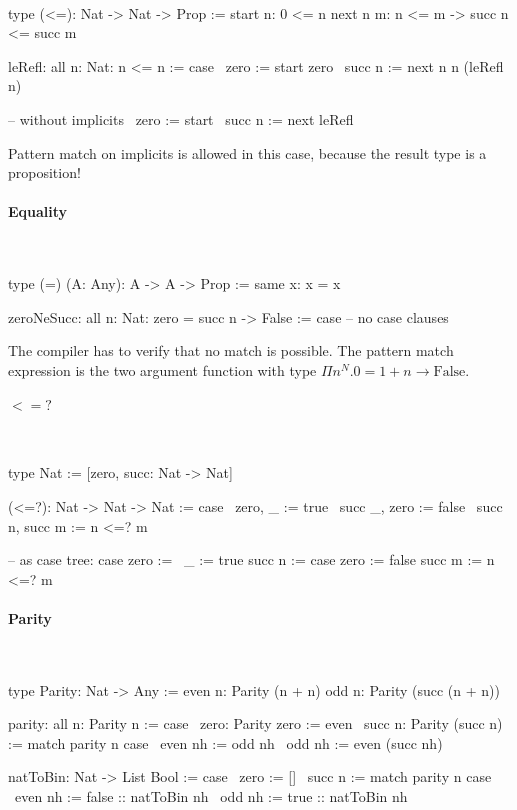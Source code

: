 \ \begin{alba}
    type (<=): Nat -> Nat -> Prop :=
        start {n}:    0 <= n
        next  {n m}:  n <= m -> succ n <= succ m

    leRefl: all {n: Nat}: n <= n := case
        \ {zero}   := start {zero}
        \ {succ n} := next {n} {n} (leRefl {n})

        -- without implicits
        \ {zero}   := start
        \ {succ n} := next leRefl
\end{alba}

Pattern match on implicits is allowed in this case, because the result type is a
proposition!




\paragraph{Equality}

\ \begin{alba}
    type (=) (A: Any): A -> A -> Prop :=
        same {x}: x = x

    zeroNeSucc: all {n: Nat}: zero = succ n -> False :=
        case
            -- no case clauses
\end{alba}

The compiler has to verify that no match is possible. The pattern match
expression is the two argument function with type $\Pi n^N. 0 = 1 + n \to
\text{False}$.



\paragraph{$<=?$}
\ \begin{alba}
    type Nat := [zero, succ: Nat -> Nat]

    (<=?): Nat -> Nat -> Nat := case
        \ zero,   _      :=  true
        \ succ _, zero   :=  false
        \ succ n, succ m :=  n <=? m

    -- as case tree:
    case
        zero           :=   \ _ := true
        succ n :=
            case
                zero   :=   false
                succ m :=   n <=? m
\end{alba}


\paragraph{Parity}
\ \begin{alba}
    type Parity: Nat -> Any :=
        even n: Parity (n + n)
        odd  n: Parity (succ (n + n))

    parity: all n: Parity n := case
        \ zero: Parity zero :=
            even
        \ succ n: Parity (succ n) :=
            match parity n case
                \ even nh :=
                    odd nh
                \ odd nh :=
                    even (succ nh)

    natToBin: Nat -> List Bool := case
        \ zero :=
            []
        \ succ n :=
            match parity n case
                \ even nh :=
                    false :: natToBin nh
                \ odd nh :=
                    true :: natToBin nh
\end{alba}
